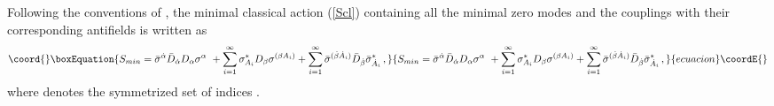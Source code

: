 \documentclass[a4paper,12pt]{article}
\begin{document}
Following the conventions of \cite{GPZ}, the minimal classical action
(\ref{Scl}) containing all the minimal zero modes and the couplings
with their corresponding antifields is written as
\begin{equation}\coord{}\boxEquation{
S_{min}= \bar
\sigma^{\dot \alpha}\bar D_{\dot \alpha} D_\alpha\sigma^\alpha\  + 
\sum^{\infty}_{i=1}\sigma_{A_i}^* D_\beta \sigma^{(\beta A_i)} +  
\sum^{\infty}_{i= 1} \bar\sigma^{(\dot \beta \dot A_i)}  \bar D_{\dot
  \beta} \bar\sigma_{\dot A_i}^* 
\, , \label{min}
}{
S_{min}= \bar
\sigma^{\dot \alpha}\bar D_{\dot \alpha} D_\alpha\sigma^\alpha\  + 
\sum^{\infty}_{i=1}\sigma_{A_i}^* D_\beta \sigma^{(\beta A_i)} +  
\sum^{\infty}_{i= 1} \bar\sigma^{(\dot \beta \dot A_i)}  \bar D_{\dot
  \beta} \bar\sigma_{\dot A_i}^* 
\, , }{ecuacion}\coordE{}\end{equation}
where \coordHE{} denotes the symmetrized set of indices \coordHE{}.  
\end{document}

